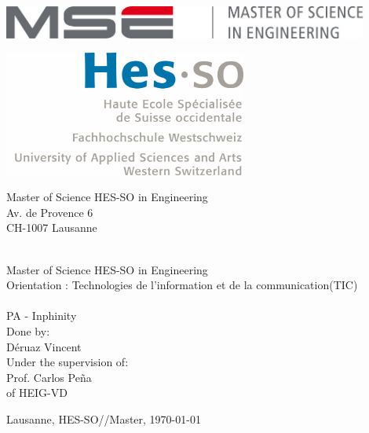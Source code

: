 \documentclass[a4paper,11pt]{report}
\begin{document}
\begin{titlepage}
\begin{flushright}
\begin{minipage}{0.5\textwidth}
\begin{flushleft}
\includegraphics[width=0.9\textwidth]{./img/mse_logo}
\end{flushleft}
\end{minipage}%
\begin{minipage}{0.5\textwidth}
\begin{flushright}
\includegraphics[width=0.6\textwidth]{./img/logo_hes-so}
\end{flushright}
\end{minipage}
\begin{flushleft}
\footnotesize
Master of Science HES-SO in Engineering \\
Av. de Provence 6 \\
CH-1007 Lausanne
\end{flushleft}
~\\[0.5cm]

\huge Master of Science HES-SO in Engineering\\[0.5cm]

\large Orientation : Technologies de l’information et de la communication(TIC)\\[0.5cm]
~\\[1cm]
{
\Huge PA - Inphinity \\[1.5cm]
}
{
Done by:\\
\huge Déruaz Vincent\\[0.5cm]
}
{
Under the supervision of: \\
Prof. Carlos Peña \\
of HEIG-VD
}
\vfill

{Lausanne, HES-SO//Master, \today}

\end{flushright}
\end{titlepage}
\end{document}
